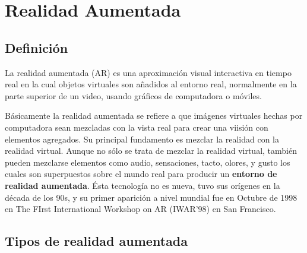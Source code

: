 \section{Realidad Aumentada}

\subsection{Definición}
La realidad aumentada (AR) es una aproximación visual interactiva en tiempo real en la cual objetos virtuales son añadidos al entorno real, normalmente en la parte superior de un video, usando gráficos de computadora o móviles.\cite{B04} \par
Básicamente la realidad aumentada se refiere a que imágenes virtuales hechas por computadora sean mezcladas con la vista real para crear una viisión con elementos agregados. Su principal fundamento es mezclar la realidad con la realidad virtual. Aunque no sólo se trata de mezclar la realidad virtual, también pueden mezclarse elementos como audio, sensaciones, tacto, olores, y gusto los cuales son superpuestos sobre el mundo real para producir un \textbf{entorno de realidad aumentada}.\cite{B05}
Ésta tecnología no es nueva, tuvo sus orígenes en la década de los 90s\cite{B04}, y su primer aparición a nivel mundial fue en Octubre de 1998 en The FIrst International Workshop on AR (IWAR'98) en San Francisco\cite{B05}.\par

\subsection{Tipos de realidad aumentada}

